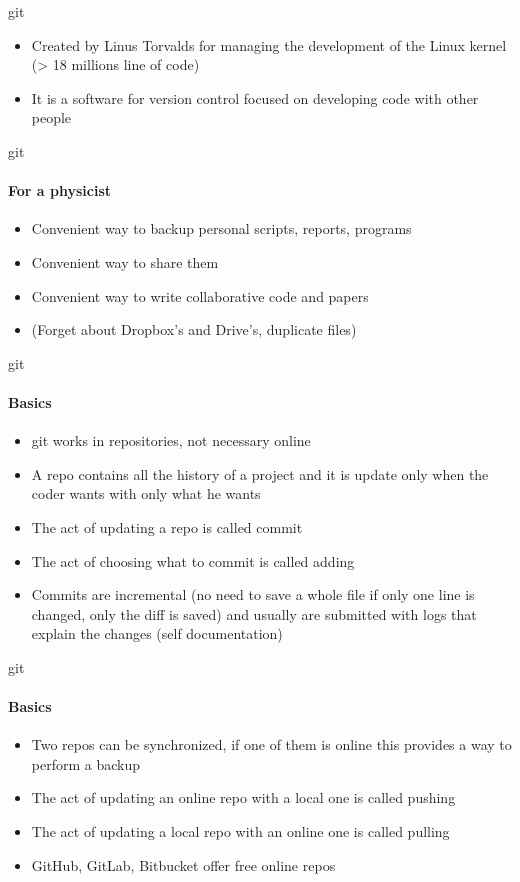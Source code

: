 \documentclass{beamer}
\begin{document}
\begin{frame}{git}
  \begin{itemize}
  \item Created by Linus Torvalds for managing the development of
    the Linux kernel (> 18 millions line of code)
  \item It is a software for \alert{version control} focused on developing code
    with other people
  \end{itemize}
\end{frame}

\begin{frame}{git}
  \framesubtitle{For a physicist}%
  \begin{itemize}
  \item Convenient way to backup personal scripts, reports, programs
  \item Convenient way to share them
  \item Convenient way to write collaborative code and papers
  \item (Forget about Dropbox's and Drive's, duplicate files)
  \end{itemize}
\end{frame}

\begin{frame}{git}
  \framesubtitle{Basics}%
  \begin{itemize}
  \item git works in \alert{repositories}, not necessary online
  \item A repo contains all the history of a project and it is update
    only when the coder wants with only what he wants
  \item The act of updating a repo is called \alert{commit}
  \item The act of choosing what to commit is called \alert{adding}
  \item Commits are incremental (no need to save a whole file if only one
    line is changed, only the diff is saved) and usually are submitted with
    logs that explain the changes (\alert{self documentation})
  \end{itemize}
\end{frame}

\begin{frame}{git}
  \framesubtitle{Basics}%
  \begin{itemize}
  \item Two repos can be synchronized, if one of them is online this provides a
    way to perform a backup
  \item The act of updating an online repo with a local one is called \alert{pushing}
  \item The act of updating a local repo with an online one is called \alert{pulling}
  \item GitHub, GitLab, Bitbucket offer free online repos
  \end{itemize}
\end{frame}
\end{document}
